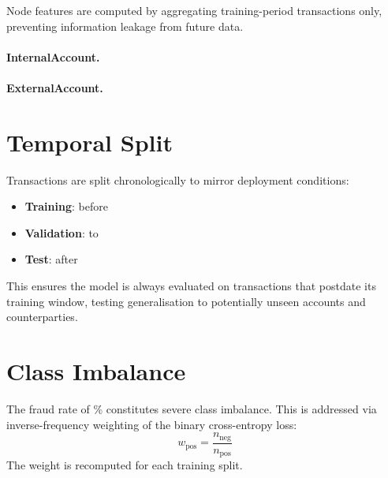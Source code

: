 Node features are computed by aggregating training-period transactions only, preventing information leakage from future data.

\paragraph{InternalAccount.}

\paragraph{ExternalAccount.}

\section{Temporal Split}
\label{sec:temporal-split}

Transactions are split chronologically to mirror deployment conditions:
\begin{itemize}[nosep]
  \item \textbf{Training}: before 
  \item \textbf{Validation}:  to 
  \item \textbf{Test}: after 
\end{itemize}

This ensures the model is always evaluated on transactions that postdate its training window, testing generalisation to potentially unseen accounts and counterparties.

\section{Class Imbalance}
\label{sec:class-imbalance}

The fraud rate of \% constitutes severe class imbalance. This is addressed via inverse-frequency weighting of the binary cross-entropy loss:
\[
  w_{\text{pos}} = \frac{n_{\text{neg}}}{n_{\text{pos}}}
\]
The weight is recomputed for each training split.
